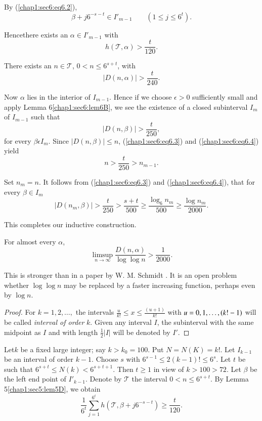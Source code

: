 By (\ref{chap1:sec6:eq6.2}),
$$
\beta + j 6^{-s-t} \in I'_{m-1} \qquad (1 \leq j \leq 6^{t}).
$$

Hence\pageoriginale there exists an $\alpha \in I'_{m-1}$ with
$$
h(\mathscr{T}, \alpha) > \frac{t}{120}.
$$

There exists an $n \in \mathscr{T}$, $0 < n \leq 6^{s+t}$, with
$$
|D(n, \alpha)| > \frac{t}{240}.
$$

Now $\alpha$ lies in the interior of $I_{m-1}$. Hence if we choose $\epsilon > 0$ sufficiently small and apply Lemma 6\ref{chap1:sec6:lem6B}, we see the existence of a closed subinterval $I_{m}$ of $I_{m-1}$ such that
\begin{equation*}
 |D(n, \beta)| > \frac{t}{250},\tag{6.4}\label{chap1:sec6:eq6.4}
\end{equation*}
for every $\beta \epsilon I_{m}$. Since $|D(n, \beta)| \leq n$, (\ref{chap1:sec6:eq6.3}) and (\ref{chap1:sec6:eq6.4}) yield
$$
n > \frac{t}{250} > n_{m-1}.
$$

Set $n_{m} = n$. It follows from (\ref{chap1:sec6:eq6.3}) and (\ref{chap1:sec6:eq6.4}), that for every $\beta \in I_{m}$
$$
|D(n_{m}, \beta)| > \frac{t}{250} > \frac{s+t}{500} \geq \frac{\log_{6} n_{m}}{500} \geq \frac{\log n_{m}}{2000}.
$$

This completes our inductive construction.

\begin{theorem}\label{chap1:sec6:thm6C}
 For almost every $\alpha$,
$$
\mathop{\lim \sup}_{n \to \infty} \frac{D(n, \alpha)}{\log \log n} > \frac{1}{2000}.
$$
\end{theorem}

This is stronger than in a paper by W. M. Schmidt \cite{21}. It is an
open problem whether $\log \log n$ may be replaced by a faster
increasing function, perhaps even by $\log n$. 

\begin{proof} 
For $k = 1, 2, \ldots,$ the intervals $\frac{u}{k!} \leq x \leq
\frac{(u+1)}{k!}$ with $u = 0, 1, \ldots,\break (k! - 1)$ will be called
     {\em interval of order} $k$. Given any interval $I$, the
     subinterval with the same midpoint as $I$ and with length
     $\frac{1}{2}|I|$ will be denoted by $I'$. 
\end{proof}

Let\pageoriginale $k$ be a fixed large integer; say $k > k_{0} =
100$. Put $N = N(K) = k!$. Let $I_{k-1}$ be an interval of order
$k-1$. Choose $s$ with $6^{s-1} \leq 2(k-1)! \leq 6^{s}$. Let $t$ be
such that $6^{s+t} \leq N(k) < 6^{s+t+1}$. Then $t \geq 1$ in view of
$k > 100 > 72$. Let $\beta$ be the left end point of
$I'_{k-1}$. Denote by $\mathscr{T}$ the interval $0 < n \leq
6^{s+t}$. By Lemma 5\ref{chap1:sec5:lem5D}, we obtain 
$$
\frac{1}{6^{t}} \sum_{j=1}^{6^{t}} h(\mathscr{T}, \beta + j 6^{-s-t}) \geq \frac{t}{120}.
$$

